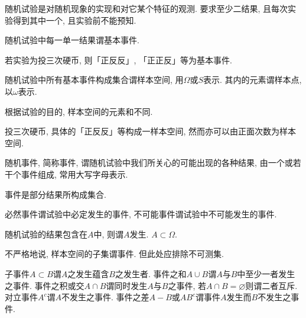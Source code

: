 \documentclass[../Statistics.tex]{subfiles}
\begin{document}
\begin{definition}
    随机试验是对随机现象的实现和对它某个特征的观测. 要求至少二结果, 且每次实验得到其中一个, 且实验前不能预知.
\end{definition}
\begin{definition}
    随机试验中每一单一结果谓基本事件.
\end{definition}
\begin{sample}
    \begin{ex}
        若实验为投三次硬币, 则「正反反」, 「正正反」等为基本事件.
    \end{ex}
\end{sample}
\begin{definition}
    随机试验中所有基本事件构成集合谓样本空间, 用$\Omega$或$S$表示. 其内的元素谓样本点, 以$\omega$表示.
\end{definition}
\begin{remark}
    根据试验的目的, 样本空间的元素和不同.
\end{remark}
\begin{sample}
    \begin{ex}
        投三次硬币, 具体的「正反反」等构成一样本空间, 然而亦可以由正面次数为样本空间.
    \end{ex}
\end{sample}
\begin{definition}
    随机事件, 简称事件, 谓随机试验中我们所关心的可能出现的各种结果, 由一个或若干个事件组成, 常用大写字母表示.
\end{definition}
\begin{finale}
    事件是部分结果所构成集合.
\end{finale}
\begin{definition}
    必然事件谓试验中必定发生的事件, 不可能事件谓试验中不可能发生的事件.
\end{definition}
\begin{definition}
    随机试验的结果包含在$A$中, 则谓$A$发生. $A\subset \Omega$.
\end{definition}
\begin{remark}
    不严格地说, 样本空间的子集谓事件. 但此处应排除不可测集.
\end{remark}
\begin{definition}
    子事件$A\subset B$谓$A$之发生蕴含$B$之发生者. 事件之和$A\cup B$谓$A$与$B$中至少一者发生之事件. 事件之积或交$A\cap B$谓同时发生$A$与$B$之事件, 若$A\cap B = \varnothing$则谓二者互斥. 对立事件$A^c$谓$A$不发生之事件. 事件之差$A-B$或$AB^c$谓事件$A$发生而$B$不发生之事件.
\end{definition}
\end{document}
